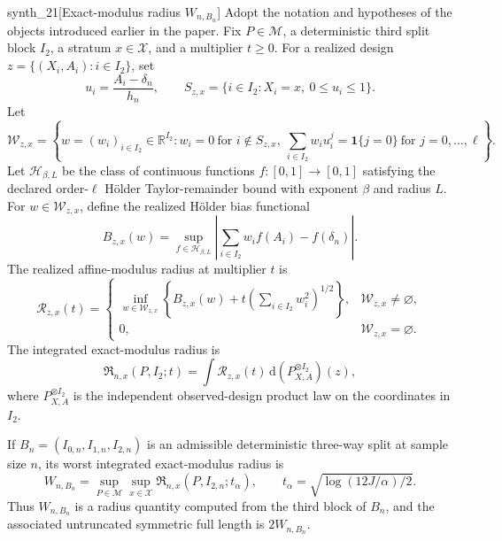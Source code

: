 \documentclass[11pt]{article}
\begin{document}
\begin{definitionv}{synth_21}[Exact-modulus radius \(W_{n,B_n}\)]
Adopt the notation and hypotheses of the objects introduced earlier in the paper.  Fix \(P\in\mathcal M\), a deterministic third split block \(I_2\), a stratum \(x\in\mathcal X\), and a multiplier \(t\geq0\).  For a realized design \(z=\{(X_i,A_i):i\in I_2\}\), set
\[
u_i=\frac{A_i-\delta_n}{h_n},
\qquad
S_{z,x}=\{i\in I_2:X_i=x,\ 0\leq u_i\leq1\}.
\]
Let
\[
\mathcal W_{z,x}
=
\left\{
w=(w_i)_{i\in I_2}\in\mathbb R^{I_2}:
w_i=0\ \text{for }i\notin S_{z,x},\
\sum_{i\in I_2}w_i u_i^j=\mathbf 1\{j=0\}\ \text{for }j=0,\ldots,\ell
\right\}.
\]
Let \(\mathcal H_{\beta,L}\) be the class of continuous functions \(f:[0,1]\to[0,1]\) satisfying the declared order-\(\ell\) Hölder Taylor-remainder bound with exponent \(\beta\) and radius \(L\).  For \(w\in\mathcal W_{z,x}\), define the realized Hölder bias functional
\[
B_{z,x}(w)
=
\sup_{f\in\mathcal H_{\beta,L}}
\left|
\sum_{i\in I_2}w_i f(A_i)-f(\delta_n)
\right|.
\]
The realized affine-modulus radius at multiplier \(t\) is
\[
\mathcal R_{z,x}(t)
=
\begin{cases}
\displaystyle
\inf_{w\in\mathcal W_{z,x}}
\left\{
B_{z,x}(w)
+
t\left(\sum_{i\in I_2}w_i^2\right)^{1/2}
\right\},
&\mathcal W_{z,x}\neq\varnothing,\\[1ex]
0,&\mathcal W_{z,x}=\varnothing.
\end{cases}
\]
The integrated exact-modulus radius is
\[
\mathfrak R_{n,x}(P,I_2;t)
=
\int
\mathcal R_{z,x}(t)\,
\mathrm d(P_{X,A}^{\otimes I_2})(z),
\]
where \(P_{X,A}^{\otimes I_2}\) is the independent observed-design product law on the coordinates in \(I_2\).

If \(B_n=(I_{0,n},I_{1,n},I_{2,n})\) is an admissible deterministic three-way split at sample size \(n\), its worst integrated exact-modulus radius is
\[
W_{n,B_n}
=
\sup_{P\in\mathcal M}\sup_{x\in\mathcal X}
\mathfrak R_{n,x}\!\left(P,I_{2,n};t_\alpha\right),
\qquad
t_\alpha=\sqrt{\log(12J/\alpha)/2}.
\]
Thus \(W_{n,B_n}\) is a radius quantity computed from the third block of \(B_n\), and the associated untruncated symmetric full length is \(2W_{n,B_n}\).
\end{definitionv}
\end{document}
